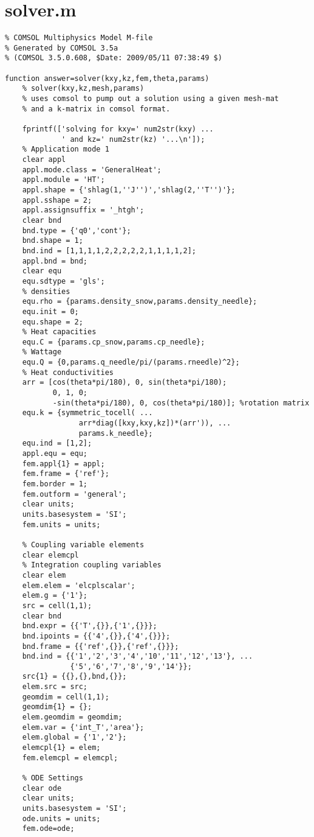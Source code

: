 \section{solver.m}
\small
\begin{verbatim}
% COMSOL Multiphysics Model M-file
% Generated by COMSOL 3.5a 
% (COMSOL 3.5.0.608, $Date: 2009/05/11 07:38:49 $)

function answer=solver(kxy,kz,fem,theta,params)
    % solver(kxy,kz,mesh,params)
    % uses comsol to pump out a solution using a given mesh-mat
    % and a k-matrix in comsol format.

    fprintf(['solving for kxy=' num2str(kxy) ...
             ' and kz=' num2str(kz) '...\n']);
    % Application mode 1
    clear appl
    appl.mode.class = 'GeneralHeat';
    appl.module = 'HT';
    appl.shape = {'shlag(1,''J'')','shlag(2,''T'')'};
    appl.sshape = 2;
    appl.assignsuffix = '_htgh';
    clear bnd
    bnd.type = {'q0','cont'};
    bnd.shape = 1;
    bnd.ind = [1,1,1,1,2,2,2,2,2,1,1,1,1,2];
    appl.bnd = bnd;
    clear equ
    equ.sdtype = 'gls';
    % densities
    equ.rho = {params.density_snow,params.density_needle};
    equ.init = 0;
    equ.shape = 2;
    % Heat capacities
    equ.C = {params.cp_snow,params.cp_needle};
    % Wattage
    equ.Q = {0,params.q_needle/pi/(params.rneedle)^2};
    % Heat conductivities
    arr = [cos(theta*pi/180), 0, sin(theta*pi/180);
           0, 1, 0;
           -sin(theta*pi/180), 0, cos(theta*pi/180)]; %rotation matrix
    equ.k = {symmetric_tocell( ...
                 arr*diag([kxy,kxy,kz])*(arr')), ...
                 params.k_needle};
    equ.ind = [1,2];
    appl.equ = equ;
    fem.appl{1} = appl;
    fem.frame = {'ref'};
    fem.border = 1;
    fem.outform = 'general';
    clear units;
    units.basesystem = 'SI';
    fem.units = units;

    % Coupling variable elements
    clear elemcpl
    % Integration coupling variables
    clear elem
    elem.elem = 'elcplscalar';
    elem.g = {'1'};
    src = cell(1,1);
    clear bnd
    bnd.expr = {{'T',{}},{'1',{}}};
    bnd.ipoints = {{'4',{}},{'4',{}}};
    bnd.frame = {{'ref',{}},{'ref',{}}};
    bnd.ind = {{'1','2','3','4','10','11','12','13'}, ...
               {'5','6','7','8','9','14'}};
    src{1} = {{},{},bnd,{}};
    elem.src = src;
    geomdim = cell(1,1);
    geomdim{1} = {};
    elem.geomdim = geomdim;
    elem.var = {'int_T','area'};
    elem.global = {'1','2'};
    elemcpl{1} = elem;
    fem.elemcpl = elemcpl;

    % ODE Settings
    clear ode
    clear units;
    units.basesystem = 'SI';
    ode.units = units;
    fem.ode=ode;


\end{verbatim}
